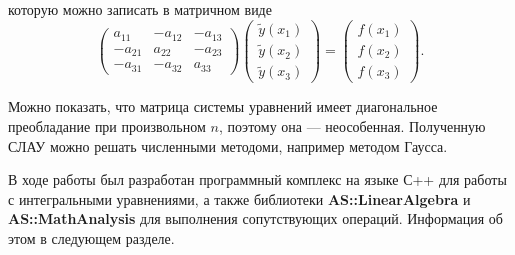 \documentclass{spisok-article}
\begin{document}
которую можно записать в матричном виде
$$
\left(
\begin{array}{ccc}
	a_{11} & -a_{12} & -a_{13}\\
	-a_{21} & a_{22} & -a_{23}\\
	-a_{31} & -a_{32} & a_{33}
\end{array}
\right)
\left(
\begin{array}{c}
	\tilde y\left(x_1\right)\\
	\tilde y\left(x_2\right)\\
	\tilde y\left(x_3\right)
\end{array}
\right)=
\left(
\begin{array}{c}
	f\left(x_1\right)\\
	f\left(x_2\right)\\
	f\left(x_3\right)
\end{array}
\right).
$$

Можно показать, что матрица системы уравнений имеет диагональное преобладание при произвольном $n$, поэтому она --- неособенная. Полученную СЛАУ можно решать численными методоми, например методом Гаусса.


В ходе работы был разработан программный комплекс на языке С++ для работы с интегральными уравнениями, а также библиотеки \textbf{AS::LinearAlgebra} и \textbf{AS::MathAnalysis} для выполнения сопутствующих операций. Информация об этом в следующем разделе. %


\end{document}
